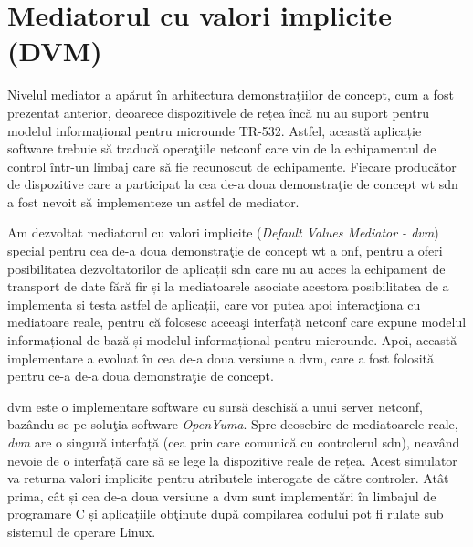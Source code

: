 \chapter{Mediatorul cu valori implicite (DVM)\label{ch:dvm_v01}}

\graphicspath{ {cap-dvm_v01/figures/} }

Nivelul mediator a apărut în arhitectura demonstraţiilor de concept, cum a fost prezentat anterior, deoarece dispozitivele de rețea încă nu au suport pentru modelul informațional pentru microunde TR-532. Astfel, această aplicație software trebuie să traducă operaţiile \gls{netconf} care vin de la echipamentul de control într-un limbaj care să fie recunoscut de echipamente. Fiecare producător de dispozitive care a participat la cea de-a doua demonstraţie de concept \gls{wt} \gls{sdn} a fost nevoit să implementeze un astfel de mediator.

Am dezvoltat mediatorul cu valori implicite (\textit{Default Values Mediator - \gls{dvm}}) special pentru cea de-a doua demonstraţie de concept \gls{wt} a \gls{onf}, pentru a oferi posibilitatea dezvoltatorilor de aplicații \gls{sdn} care nu au acces la echipament de transport de date fără fir și la mediatoarele asociate acestora posibilitatea de a implementa și testa astfel de aplicații, care vor putea apoi interacţiona cu mediatoare reale, pentru că folosesc aceeaşi interfață \gls{netconf} care expune modelul informațional de bază și modelul informațional pentru microunde. Apoi, această implementare a evoluat în cea de-a doua versiune a \gls{dvm}, care a fost folosită pentru ce-a de-a doua demonstraţie de concept.

\gls{dvm} este o implementare software cu sursă deschisă a unui server \gls{netconf}, bazându-se pe soluţia software \textit{OpenYuma}. Spre deosebire de mediatoarele reale, \textit{\gls{dvm}} are o singură interfață (cea prin care comunică cu controlerul \gls{sdn}), neavând nevoie de o interfață care să se lege la dispozitive reale de rețea. Acest simulator va returna valori implicite pentru atributele interogate de către controler. Atât prima, cât și cea de-a doua versiune a \gls{dvm} sunt implementări în limbajul de programare C și aplicațiile obţinute după compilarea codului pot fi rulate sub sistemul de operare Linux.







